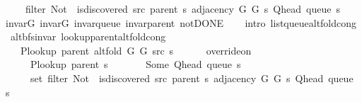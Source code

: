 \begin{isabellebody}
\ \ \ \ \ filter\ {\isacharparenleft}{\kern0pt}Not\ {\isasymcirc}\ is{\isacharunderscore}{\kern0pt}discovered\ src\ {\isacharparenleft}{\kern0pt}parent\ s{\isacharparenright}{\kern0pt}{\isacharparenright}{\kern0pt}\ {\isacharparenleft}{\kern0pt}adjacency\ G{}\ G{}\ s\ {\isacharparenleft}{\kern0pt}Q{\isacharunderscore}{\kern0pt}head\ {\isacharparenleft}{\kern0pt}queue\ s{\isacharparenright}{\kern0pt}{\isacharparenright}{\kern0pt}{\isacharparenright}{\kern0pt}{\isachardoublequoteclose}\isanewline
%
\isadelimproof
\ \ %
\endisadelimproof
%
\isatagproof
{}\isamarkupfalse%
\ invar{\isacharunderscore}{\kern0pt}G{}\ invar{\isacharunderscore}{\kern0pt}G{}\ invar{\isacharunderscore}{\kern0pt}queue\ invar{\isacharunderscore}{\kern0pt}parent\ not{\isacharunderscore}{\kern0pt}DONE\isanewline
\ \ \isamarkupfalse%
\ {\isacharparenleft}{\kern0pt}intro\ list{\isacharunderscore}{\kern0pt}queue{\isacharunderscore}{\kern0pt}alt{\isacharunderscore}{\kern0pt}fold{\isacharunderscore}{\kern0pt}cong{\isacharparenright}{\kern0pt}%
\endisatagproof
{\isafoldproof}%
%
\isadelimproof
\isanewline
%
\endisadelimproof
\isanewline
{}\isamarkupfalse%
\ {\isacharparenleft}{\kern0pt}\ alt{\isacharunderscore}{\kern0pt}bfs{\isacharunderscore}{\kern0pt}invar{\isacharparenright}{\kern0pt}\ lookup{\isacharunderscore}{\kern0pt}parent{\isacharunderscore}{\kern0pt}alt{\isacharunderscore}{\kern0pt}fold{\isacharunderscore}{\kern0pt}cong{\isacharcolon}{\kern0pt}\isanewline
\ \ \isanewline
\ \ \ \ {\isachardoublequoteopen}P{\isacharunderscore}{\kern0pt}lookup\ {\isacharparenleft}{\kern0pt}parent\ {\isacharparenleft}{\kern0pt}alt{\isacharunderscore}{\kern0pt}fold\ G{}\ G{}\ src\ s{\isacharparenright}{\kern0pt}{\isacharparenright}{\kern0pt}\ {\isacharequal}{\kern0pt}\isanewline
\ \ \ \ \ override{\isacharunderscore}{\kern0pt}on\isanewline
\ \ \ \ \ \ {\isacharparenleft}{\kern0pt}P{\isacharunderscore}{\kern0pt}lookup\ {\isacharparenleft}{\kern0pt}parent\ s{\isacharparenright}{\kern0pt}{\isacharparenright}{\kern0pt}\isanewline
\ \ \ \ \ \ {\isacharparenleft}{\kern0pt}{\isasymlambda}{\isacharunderscore}{\kern0pt}{\isachardot}{\kern0pt}\ Some\ {\isacharparenleft}{\kern0pt}Q{\isacharunderscore}{\kern0pt}head\ {\isacharparenleft}{\kern0pt}queue\ s{\isacharparenright}{\kern0pt}{\isacharparenright}{\kern0pt}{\isacharparenright}{\kern0pt}\isanewline
\ \ \ \ \ \ {\isacharparenleft}{\kern0pt}set\ {\isacharparenleft}{\kern0pt}filter\ {\isacharparenleft}{\kern0pt}Not\ {\isasymcirc}\ is{\isacharunderscore}{\kern0pt}discovered\ src\ {\isacharparenleft}{\kern0pt}parent\ s{\isacharparenright}{\kern0pt}{\isacharparenright}{\kern0pt}\ {\isacharparenleft}{\kern0pt}adjacency\ G{}\ G{}\ s\ {\isacharparenleft}{\kern0pt}Q{\isacharunderscore}{\kern0pt}head\ {\isacharparenleft}{\kern0pt}queue\ s{\isacharparenright}{\kern0pt}{\isacharparenright}{\kern0pt}{\isacharparenright}{\kern0pt}{\isacharparenright}{\kern0pt}{\isacharparenright}{\kern0pt}{\isachardoublequoteclose}\isanewline

\end{isabellebody}
